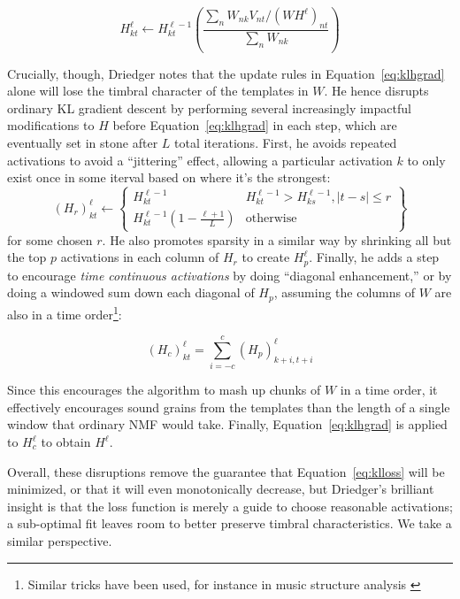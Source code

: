\documentclass{article}
\begin{document}
\begin{equation}
\label{eq:klhgrad}
H_{kt}^{\ell} \gets H_{kt}^{\ell-1} \left( \frac{ \sum_{n} W_{nk} V_{nt} / (WH^{\ell})_{nt} }{ \sum_{n} W_{nk} } \right)
\end{equation}

Crucially, though, Driedger notes that the update rules in Equation~\ref{eq:klhgrad} alone will lose the timbral character of the templates in $W$.  He hence disrupts ordinary KL gradient descent by performing several increasingly impactful modifications to $H$ before Equation~\ref{eq:klhgrad} in each step, which are eventually set in stone after $L$ total iterations.  First, he avoids repeated activations to avoid a ``jittering'' effect, allowing a particular activation $k$ to only exist once in some iterval based on where it's the strongest:
\begin{equation}
    (H_r)_{kt}^{\ell} \gets \left\{ \begin{array}{cc} H^{\ell-1}_{kt} & H^{\ell-1}_{kt} > H^{\ell-1}_{ks}, |t - s| \leq r \\ H^{\ell-1}_{kt} (1 - \frac{\ell+1}{L}) & \text{otherwise}  \end{array} \right\}
\end{equation}
for some chosen $r$.  He also promotes sparsity in a similar way by shrinking all but the top $p$ activations in each column of $H_r$ to create $H_p^{\ell}$.  Finally, he adds a step to encourage {\em time continuous activations} by doing ``diagonal enhancement,'' or by doing a windowed sum down each diagonal of $H_p$, assuming the columns of $W$ are also in a time order\footnote{Similar tricks have been used, for instance in music structure analysis \cite{mcfee2014analyzing}}:

\begin{equation}
(H_c)_{kt}^{\ell} = \sum_{i=-c}^c (H_p)^{\ell}_{k+i, t+i}
\end{equation}

Since this encourages the algorithm to mash up chunks of $W$ in a time order, it effectively encourages sound grains from the templates than the length of a single window that ordinary NMF would take.  Finally, Equation~\ref{eq:klhgrad} is applied to $H_c^{\ell}$ to obtain $H^{\ell}$.

Overall, these disruptions remove the guarantee that Equation~\ref{eq:klloss} will be minimized, or that it will even monotonically decrease, but Driedger's brilliant insight is that the loss function is merely a guide to choose reasonable activations; a sub-optimal fit leaves room to better preserve timbral characteristics.  We take a similar perspective.
\end{document}
